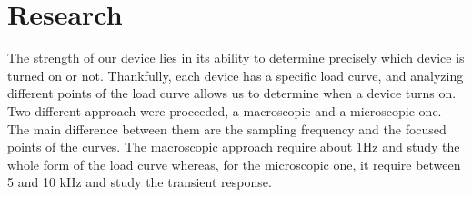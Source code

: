 %
%
\section{Research}

The strength of our device lies in its ability to determine precisely which device is turned on or not. Thankfully, each device has a specific load curve, and analyzing different points of the load curve allows us to determine when a device turns on. Two different approach were proceeded, a macroscopic and a microscopic one. The main difference between them are the sampling frequency and the focused points of the curves. The macroscopic approach require about 1Hz and study the whole form of the load curve whereas, for the microscopic one, it require between 5 and 10 kHz and study the transient response.




